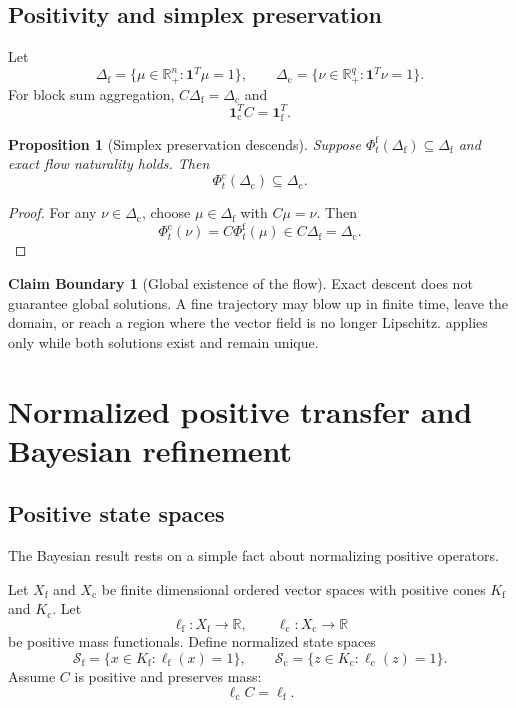 \documentclass[11pt]{article}
\newtheorem{proposition}[theorem]{Proposition}
\theoremstyle{definition}
\newtheorem{boundary}[theorem]{Claim Boundary}
\theoremstyle{remark}
\newcommand{\R}{\mathbb R}
\newcommand{\cS}{\mathcal S}
\newcommand{\fine}{\mathrm f}
\newcommand{\coarse}{\mathrm c}
\newcommand{\one}{\mathbf 1}
\begin{document}
\subsection{Positivity and simplex preservation}
Let
\[
  \Delta_{\fine}
  =\{\mu\in\R_+^n:\one^T\mu=1\},
  \qquad
  \Delta_{\coarse}
  =\{\nu\in\R_+^q:\one^T\nu=1\}.
\]
For block sum aggregation, $C\Delta_{\fine}=\Delta_{\coarse}$ and
\[
  \one_{\coarse}^TC=\one_{\fine}^T.
\]

\begin{proposition}[Simplex preservation descends]\label{prop:simplex-descends}
Suppose $\Phi_t^{\fine}(\Delta_{\fine})\subseteq\Delta_{\fine}$ and exact flow naturality holds.  Then
\[
  \Phi_t^{\coarse}(\Delta_{\coarse})\subseteq\Delta_{\coarse}.
\]
\end{proposition}

\begin{proof}
For any $\nu\in\Delta_{\coarse}$, choose $\mu\in\Delta_{\fine}$ with $C\mu=\nu$.  Then
\[
  \Phi_t^{\coarse}(\nu)
  =C\Phi_t^{\fine}(\mu)
  \in C\Delta_{\fine}
  =\Delta_{\coarse}.
\]
\end{proof}

\begin{boundary}[Global existence of the flow]
Exact descent does not guarantee global solutions.  A fine trajectory may blow up in finite time, leave the domain, or reach a region where the vector field is no longer Lipschitz.   applies only while both solutions exist and remain unique.
\end{boundary}

\section{Normalized positive transfer and Bayesian refinement}\label{sec:bayes}

\subsection{Positive state spaces}
The Bayesian result rests on a simple fact about normalizing positive operators.

Let $X_{\fine}$ and $X_{\coarse}$ be finite dimensional ordered vector spaces with positive cones $K_{\fine}$ and $K_{\coarse}$.  Let
\[
  \ell_{\fine}:X_{\fine}\to\R,
  \qquad
  \ell_{\coarse}:X_{\coarse}\to\R
\]
be positive mass functionals.  Define normalized state spaces
\[
  \cS_{\fine}
  =\{x\in K_{\fine}:\ell_{\fine}(x)=1\},
  \qquad
  \cS_{\coarse}
  =\{z\in K_{\coarse}:\ell_{\coarse}(z)=1\}.
\]
Assume $C$ is positive and preserves mass:
\begin{equation}\label{eq:mass-preserving-C}
  \ell_{\coarse}C=\ell_{\fine}.
\end{equation}
\end{document}
